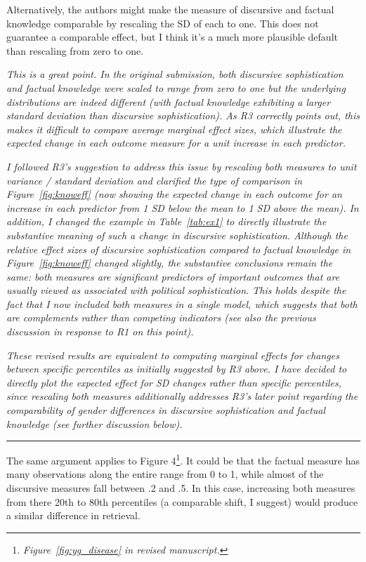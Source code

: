 Alternatively, the authors might make the measure of discursive and factual knowledge comparable by rescaling the SD of each to one. This does not guarantee a comparable effect, but I think it’s a much more plausible default than rescaling from zero to one.

\textit{This is a great point. In the original submission, both discursive sophistication and factual knowledge were scaled to range from zero to one but the underlying distributions are indeed different (with factual knowledge exhibiting a larger standard deviation than discursive sophistication). As R3 correctly points out, this makes it difficult to compare average marginal effect sizes, which illustrate the expected change in each outcome measure for a unit increase in each predictor.}

\textit{I followed R3's suggestion to address this issue by rescaling both measures to unit variance / standard deviation and clarified the type of comparison in Figure~\ref{fig:knoweff} (now showing the expected change in each outcome for an increase in each predictor from 1 SD below the mean to 1 SD above the mean). In addition, I changed the example in Table~\ref{tab:ex1} to directly illustrate the substantive meaning of such a change in discursive sophistication. Although the relative effect sizes of discursive sophistication compared to factual knowledge in Figure~\ref{fig:knoweff} changed slightly, the substantive conclusions remain the same: both measures are significant predictors of important outcomes that are usually viewed as associated with political sophistication. This holds despite the fact that I now included both measures in a single model, which suggests that both are complements rather than competing indicators (see also the previous discussion in response to R1 on this point).}

\textit{These revised results are equivalent to computing marginal effects for changes between specific percentiles as initially suggested by R3 above. I have decided to directly plot the expected effect for SD changes rather than specific percentiles, since rescaling both measures additionally addresses R3's later point regarding the comparability of gender differences in discursive sophistication and factual knowledge (see further discussion below).}


\rule{\linewidth}{.01cm}

The same argument applies to Figure 4\footnote{\textit{Figure~\ref{fig:yg_disease} in revised manuscript.}}. It could be that the factual measure has many observations along the entire range from 0 to 1, while almost of the discursive measures fall between .2 and .5. In this case, increasing both measures from there 20th to 80th percentiles (a comparable shift, I suggest) would produce a similar difference in retrieval.

